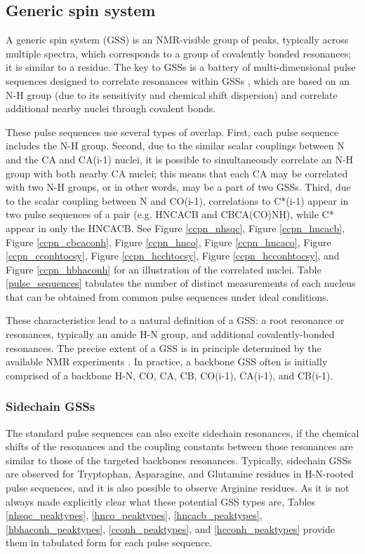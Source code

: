 \subsection*{Generic spin system}
A generic spin system (GSS) is an NMR-visible group of peaks, typically 
across multiple spectra, which corresponds to a group of covalently bonded 
resonances; it is similar to a residue.  
The key to GSSs is a battery of multi-dimensional pulse 
sequences designed to correlate resonances within GSSs 
\cite{cavanagh1995protein, hncacb, hnco, cbcaconh}, which are
based on an N-H group (due to its sensitivity and chemical shift dispersion)
and correlate additional nearby nuclei through covalent bonds.

These pulse sequences use several types of overlap.  First, each pulse sequence
includes the N-H group.  Second, due to the similar scalar couplings between
N and the CA and CA(i-1) nuclei, it is possible to simultaneously correlate an
N-H group with both nearby CA nuclei; this means that each CA may be correlated
with two N-H groups, or in other words, may be a part of two GSSs. 
Third, due to the scalar coupling between N and CO(i-1), correlations to 
C*(i-1) appear in two pulse sequences of a pair (e.g. HNCACB and CBCA(CO)NH), 
while C* appear in only the HNCACB.  See Figure \ref{ccpn_nhsqc}, 
Figure \ref{ccpn_hncacb}, Figure \ref{ccpn_cbcaconh}, Figure \ref{ccpn_hnco}, 
Figure \ref{ccpn_hncaco}, Figure \ref{ccpn_cconhtocsy}, Figure \ref{ccpn_hcchtocsy},
Figure \ref{ccpn_hcconhtocsy}, and Figure \ref{ccpn_hbhaconh} for an 
illustration of the correlated nuclei.  Table \ref{pulse_sequences} tabulates
the number of distinct measurements of each nucleus that can be obtained from
common pulse sequences under ideal conditions.

These characteristics lead to a natural definition of a GSS: a root 
resonance or resonances, typically an amide H-N group, and additional 
covalently-bonded resonances.  The precise extent of a GSS is in principle 
determined by the available NMR experiments \cite{hncacb, hnco, cbcaconh}.  
In practice, a backbone GSS often is initially 
comprised of a backbone H-N, CO, CA, CB, CO(i-1), CA(i-1), and CB(i-1).

\subsubsection{Sidechain GSSs}
The standard pulse sequences can also excite sidechain resonances, if the 
chemical shifts of the resonances and the coupling constants between those
resonances are similar to those of the targeted backbones resonances.
Typically, sidechain GSSs are observed for Tryptophan, Asparagine, and Glutamine
residues in H-N-rooted pulse sequences, and it is also possible to observe
Arginine residues.
As it is not always made explicitly clear what these potential GSS types
are, Tables \ref{nhsqc_peaktypes}, \ref{hnco_peaktypes}, 
\ref{hncacb_peaktypes}, \ref{hbhaconh_peaktypes}, \ref{cconh_peaktypes}, and
\ref{hcconh_peaktypes} provide them in tabulated form for each pulse sequence.


